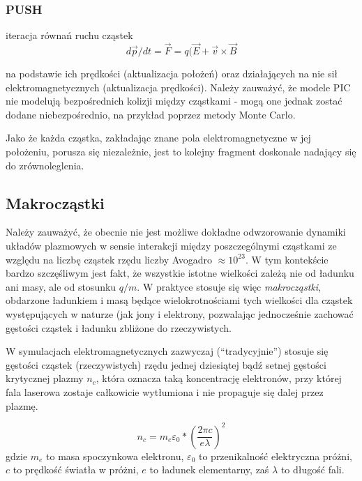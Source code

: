     \subsubsection{PUSH}
    iteracja równań ruchu cząstek
    \begin{equation}
        d \vec{p}/dt = \vec{F} = q (\vec{E} + \vec{v} \times \vec{B}
        \label{eq-of-motion}
    \end{equation}
    
    na podstawie ich prędkości (aktualizacja położeń)
    oraz działających na nie sił elektromagnetycznych (aktualizacja prędkości). Należy zauważyć, że modele PIC
    nie modelują bezpośrednich kolizji między cząstkami - mogą one jednak zostać dodane niebezpośrednio, na przykład
    poprzez metody Monte Carlo. 

    Jako że każda cząstka, zakładając znane pola elektromagnetyczne w jej położeniu, porusza się niezależnie,
    jest to kolejny fragment doskonale nadający się do zrównoleglenia.

    \subsection{Makrocząstki}
    Należy zauważyć, że obecnie nie jest możliwe dokładne odwzorowanie dynamiki układów plazmowych w sensie interakcji
    między poszczególnymi cząstkami ze względu na liczbę cząstek rzędu liczby Avogadro $\approx 10^{23}$.
    W tym kontekście bardzo szczęśliwym jest fakt, że wszystkie istotne wielkości zależą nie od ładunku ani masy,
    ale od stosunku $q/m$. W praktyce stosuje się więc \emph{makrocząstki}, obdarzone ładunkiem i masą będące wielokrotnościami
    tych wielkości dla cząstek występujących w naturze (jak jony i elektrony, pozwalając jednocześnie zachować gęstości
    cząstek i ładunku 
    zbliżone do rzeczywistych.

    W symulacjach elektromagnetycznych zazwyczaj (``tradycyjnie'') stosuje się gęstości cząstek (rzeczywistych)
    rzędu jednej dziesiątej bądź setnej gęstości
    krytycznej plazmy $n_c$, która oznacza taką koncentrację elektronów, przy której 
    fala laserowa zostaje całkowicie wytłumiona i nie propaguje się dalej przez plazmę.

    \begin{equation}
        n_c = m_e \varepsilon_0 * (\frac{2 \pi c}{e \lambda})^2
        \label{eqn:critical-density}
    \end{equation}
    gdzie $m_e$ to masa spoczynkowa elektronu, $\varepsilon_0$ to przenikalność elektryczna próżni, 
    $c$ to prędkość światła w próżni, $e$ to ładunek elementarny, zaś $\lambda$ to długość fali.

